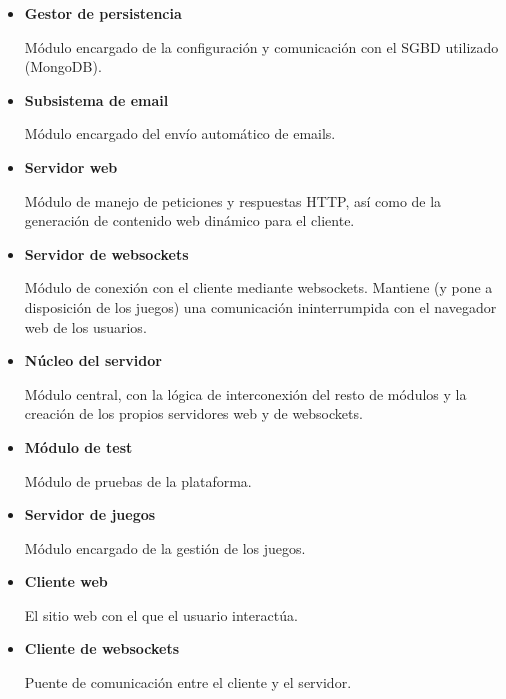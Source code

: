 \begin{itemize}
\item {\bf Gestor de persistencia}

Módulo encargado de la configuración y comunicación con el \acf{SGBD} utilizado (MongoDB).

\item {\bf Subsistema de email}

Módulo encargado del envío automático de emails.

\item {\bf Servidor web}

Módulo de manejo de peticiones y respuestas \acs{HTTP}, así como de la generación de contenido web dinámico para el cliente.

\item {\bf Servidor de websockets}

Módulo de conexión con el cliente mediante websockets. Mantiene (y pone a disposición de los juegos) una comunicación ininterrumpida con el navegador web de los usuarios.

\item {\bf Núcleo del servidor}

Módulo central, con la lógica de interconexión del resto de módulos y la creación de los propios servidores web y de websockets.

\item {\bf Módulo de test}

Módulo de pruebas de la plataforma.

\item {\bf Servidor de juegos}

Módulo encargado de la gestión de los juegos.

\item {\bf Cliente web}

El sitio web con el que el usuario interactúa.

\item {\bf Cliente de websockets}

Puente de comunicación entre el cliente y el servidor.

\end{itemize}




